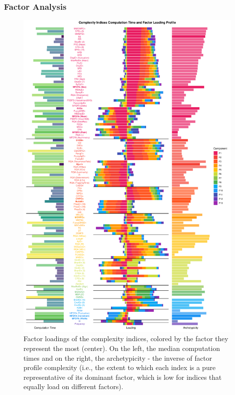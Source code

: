 \documentclass[
  man]{apa6}
\begin{document}
\hypertarget{factor-analysis}{%
\subsubsection{Factor Analysis}\label{factor-analysis}}

\begin{figure}
\centering
\includegraphics{./figures/loadings-1.pdf}
\caption{\label{fig:loadings}Factor loadings of the complexity indices, colored by the factor they represent the most (center). On the left, the median computation times and on the right, the archetypicity - the inverse of factor profile complexity (i.e., the extent to which each index is a pure representative of its dominant factor, which is low for indices that equally load on different factors).}
\end{figure}
\end{document}
